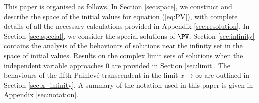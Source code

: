 This paper is organised as follows.
In Section \ref{sec:space}, we construct and describe the space of the initial values for equation (\ref{eq:PV}), with
complete details of all the necessary calculations provided in Appendix \ref{sec:resolution}.
In Section \ref{sec:special}, we consider the special solutions of $\PV$.
Section \ref{sec:infinity} contains the analysis of the behaviours of solutions near the infinity set in the space of initial values. Results on the complex limit sets of solutions when the independent variable approaches $0$ are provided in Section \ref{sec:limit}.
The behaviours of the fifth Painlev\'e transcendent in the limit $x\to\infty$ are outlined in Section \ref{sec:x_infinity}.
A summary of the notation used in this paper is given in Appendix \ref{sec:notation}.


